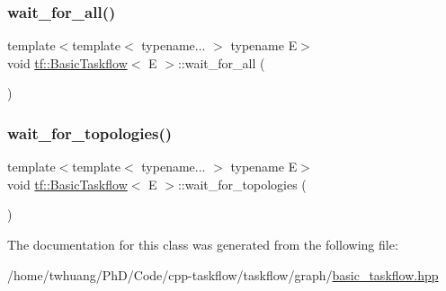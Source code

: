 \subsubsection{\texorpdfstring{wait\+\_\+for\+\_\+all()}{wait\_for\_all()}}
{\footnotesize\ttfamily template$<$template$<$ typename... $>$ typename E$>$ \\
void \hyperlink{classtf_1_1BasicTaskflow}{tf\+::\+Basic\+Taskflow}$<$ E $>$\+::wait\+\_\+for\+\_\+all (\begin{DoxyParamCaption}{ }\end{DoxyParamCaption})}

\mbox{\label{classtf_1_1BasicTaskflow_a8f0ce2026118e97b83cbd727ed0932af}} 
\subsubsection{\texorpdfstring{wait\+\_\+for\+\_\+topologies()}{wait\_for\_topologies()}}
{\footnotesize\ttfamily template$<$template$<$ typename... $>$ typename E$>$ \\
void \hyperlink{classtf_1_1BasicTaskflow}{tf\+::\+Basic\+Taskflow}$<$ E $>$\+::wait\+\_\+for\+\_\+topologies (\begin{DoxyParamCaption}{ }\end{DoxyParamCaption})}



The documentation for this class was generated from the following file\+:\begin{DoxyCompactItemize}
\item 
/home/twhuang/\+Ph\+D/\+Code/cpp-\/taskflow/taskflow/graph/\hyperlink{basic__taskflow_8hpp}{basic\+\_\+taskflow.\+hpp}\end{DoxyCompactItemize}
